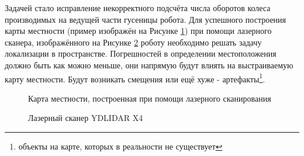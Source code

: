 \documentclass[12pt,a4paper]{scrartcl}
\begin{document}
			Задачей стало исправление некорректного подсчёта числа оборотов колеса производимых на ведущей части гусеницы робота. Для успешного построения карты местности (пример изображён на Рисунке \ref{fig:Map}) при помощи лазерного сканера, изображённого на Рисунке \ref{fig:X4} роботу необходимо решать задачу локализации в пространстве. Погрешностей в определении местоположения должно быть как можно меньше, они напрямую будут влиять на выстраиваемую карту местности. Будут возникать смещения или ещё хуже - артефакты\footnote{объекты на карте, которых в реальности не существует}.
			
			\begin{figure}[h]
				\caption{Карта местности, построенная при помощи лазерного сканирования}
				\label{fig:Map}
			\end{figure}
			
			\begin{figure}[h]
				\caption{Лазерный сканер YDLIDAR X4}
				\label{fig:X4}
			\end{figure}
			
\end{document}
